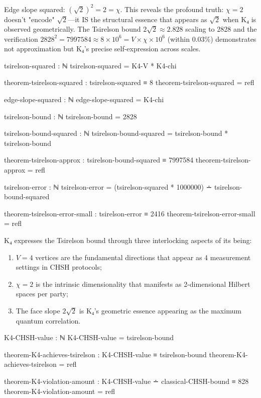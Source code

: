 \documentclass[11pt,a4paper]{book}
\begin{document}
Edge slope squared: $(\sqrt{2})^2 = 2 = \chi$. This reveals the profound truth: $\chi = 2$ doesn't "encode" $\sqrt{2}$—it IS the structural essence that appears as $\sqrt{2}$ when K₄ is observed geometrically. The Tsirelson bound $2\sqrt{2} \approx 2.828$ scaling to 2828 and the verification $2828^2 = 7997584 \approx 8 \times 10^6 = V \times \chi \times 10^6$ (within 0.03\%) demonstrates not approximation but K₄'s precise self-expression across scales.

\begin{code}
tsirelson-squared : ℕ
tsirelson-squared = K4-V * K4-chi

theorem-tsirelson-squared : tsirelson-squared ≡ 8
theorem-tsirelson-squared = refl

edge-slope-squared : ℕ
edge-slope-squared = K4-chi

tsirelson-bound : ℕ
tsirelson-bound = 2828

tsirelson-bound-squared : ℕ
tsirelson-bound-squared = tsirelson-bound * tsirelson-bound

theorem-tsirelson-approx : tsirelson-bound-squared ≡ 7997584
theorem-tsirelson-approx = refl

tsirelson-error : ℕ
tsirelson-error = (tsirelson-squared * 1000000) ∸ tsirelson-bound-squared

theorem-tsirelson-error-small : tsirelson-error ≡ 2416
theorem-tsirelson-error-small = refl

\end{code}

K₄ expresses the Tsirelson bound through three interlocking aspects of its being:
\begin{enumerate}
\item $V = 4$ vertices are the fundamental directions that appear as 4 measurement settings in CHSH protocols;
\item $\chi = 2$ is the intrinsic dimensionality that manifests as 2-dimensional Hilbert spaces per party;
\item The face slope $2\sqrt{2}$ is K₄'s geometric essence appearing as the maximum quantum correlation.
\end{enumerate}

\begin{code}
K4-CHSH-value : ℕ
K4-CHSH-value = tsirelson-bound

theorem-K4-achieves-tsirelson : K4-CHSH-value ≡ tsirelson-bound
theorem-K4-achieves-tsirelson = refl

theorem-K4-violation-amount : K4-CHSH-value ∸ classical-CHSH-bound ≡ 828
theorem-K4-violation-amount = refl

\end{code}
\end{document}
